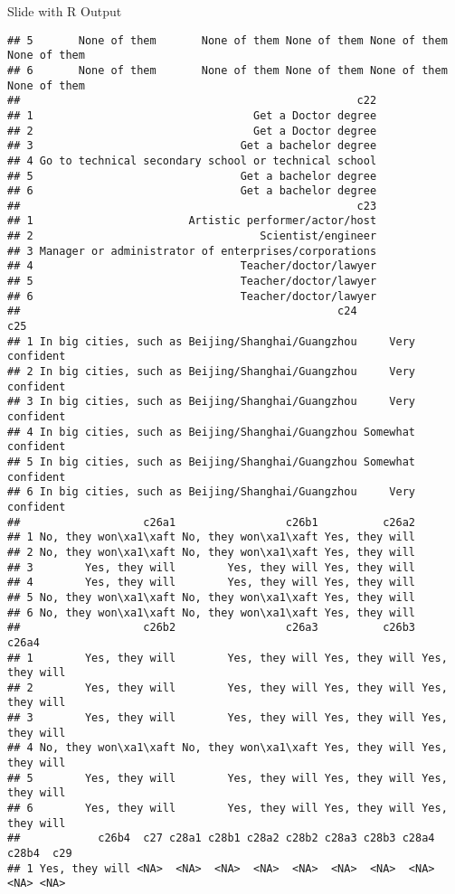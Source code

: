 \documentclass[
  ignorenonframetext,
]{beamer}
\begin{document}
\begin{frame}[fragile]{Slide with R Output}
\begin{verbatim}
## 5       None of them       None of them None of them None of them None of them
## 6       None of them       None of them None of them None of them None of them
##                                                    c22
## 1                                  Get a Doctor degree
## 2                                  Get a Doctor degree
## 3                                Get a bachelor degree
## 4 Go to technical secondary school or technical school
## 5                                Get a bachelor degree
## 6                                Get a bachelor degree
##                                                    c23
## 1                        Artistic performer/actor/host
## 2                                   Scientist/engineer
## 3 Manager or administrator of enterprises/corporations
## 4                                Teacher/doctor/lawyer
## 5                                Teacher/doctor/lawyer
## 6                                Teacher/doctor/lawyer
##                                                 c24                c25
## 1 In big cities, such as Beijing/Shanghai/Guangzhou     Very confident
## 2 In big cities, such as Beijing/Shanghai/Guangzhou     Very confident
## 3 In big cities, such as Beijing/Shanghai/Guangzhou     Very confident
## 4 In big cities, such as Beijing/Shanghai/Guangzhou Somewhat confident
## 5 In big cities, such as Beijing/Shanghai/Guangzhou Somewhat confident
## 6 In big cities, such as Beijing/Shanghai/Guangzhou     Very confident
##                   c26a1                 c26b1          c26a2
## 1 No, they won\xa1\xaft No, they won\xa1\xaft Yes, they will
## 2 No, they won\xa1\xaft No, they won\xa1\xaft Yes, they will
## 3        Yes, they will        Yes, they will Yes, they will
## 4        Yes, they will        Yes, they will Yes, they will
## 5 No, they won\xa1\xaft No, they won\xa1\xaft Yes, they will
## 6 No, they won\xa1\xaft No, they won\xa1\xaft Yes, they will
##                   c26b2                 c26a3          c26b3          c26a4
## 1        Yes, they will        Yes, they will Yes, they will Yes, they will
## 2        Yes, they will        Yes, they will Yes, they will Yes, they will
## 3        Yes, they will        Yes, they will Yes, they will Yes, they will
## 4 No, they won\xa1\xaft No, they won\xa1\xaft Yes, they will Yes, they will
## 5        Yes, they will        Yes, they will Yes, they will Yes, they will
## 6        Yes, they will        Yes, they will Yes, they will Yes, they will
##            c26b4  c27 c28a1 c28b1 c28a2 c28b2 c28a3 c28b3 c28a4 c28b4  c29
## 1 Yes, they will <NA>  <NA>  <NA>  <NA>  <NA>  <NA>  <NA>  <NA>  <NA> <NA>

\end{verbatim}
\end{frame}
\end{document}
